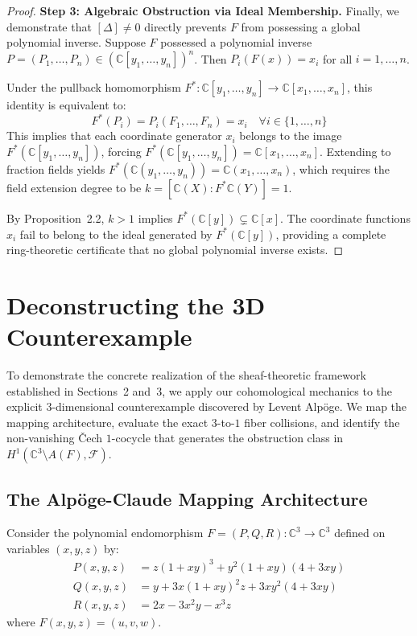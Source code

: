 \documentclass[11pt,reqno]{amsart}
\theoremstyle{definition}
\begin{document}
\begin{proof}
\textbf{Step 3: Algebraic Obstruction via Ideal Membership.}
Finally, we demonstrate that $[\Delta] \neq 0$ directly prevents $F$ from possessing a global polynomial inverse. Suppose $F$ possessed a polynomial inverse $P = (P_1, \dots, P_n) \in (\mathbb{C}[y_1, \dots, y_n])^n$. Then $P_i(F(x)) = x_i$ for all $i = 1, \dots, n$.

Under the pullback homomorphism $F^*: \mathbb{C}[y_1, \dots, y_n] \to \mathbb{C}[x_1, \dots, x_n]$, this identity is equivalent to:
$$F^*(P_i) = P_i(F_1, \dots, F_n) = x_i \quad \forall i \in \{1, \dots, n\}$$
This implies that each coordinate generator $x_i$ belongs to the image $F^*(\mathbb{C}[y_1, \dots, y_n])$, forcing $F^*(\mathbb{C}[y_1, \dots, y_n]) = \mathbb{C}[x_1, \dots, x_n]$. Extending to fraction fields yields $F^*(\mathbb{C}(y_1, \dots, y_n)) = \mathbb{C}(x_1, \dots, x_n)$, which requires the field extension degree to be $k = [\mathbb{C}(X) : F^*\mathbb{C}(Y)] = 1$.

By Proposition~2.2, $k > 1$ implies $F^*(\mathbb{C}[y]) \subsetneq \mathbb{C}[x]$. The coordinate functions $x_i$ fail to belong to the ideal generated by $F^*(\mathbb{C}[y])$, providing a complete ring-theoretic certificate that no global polynomial inverse exists.
\end{proof}

\section{Deconstructing the 3D Counterexample}

To demonstrate the concrete realization of the sheaf-theoretic framework established in Sections~2 and~3, we apply our cohomological mechanics to the explicit $3$-dimensional counterexample discovered by Levent Alp\"oge. We map the mapping architecture, evaluate the exact $3$-to-$1$ fiber collisions, and identify the non-vanishing \v{C}ech $1$-cocycle that generates the obstruction class in $H^1(\mathbb{C}^3 \setminus A(F), \mathcal{F})$.

\subsection{The Alp\"oge-Claude Mapping Architecture}
Consider the polynomial endomorphism $F = (P, Q, R): \mathbb{C}^3 \to \mathbb{C}^3$ defined on variables $(x, y, z)$ by:
\begin{align*}
P(x,y,z) &= z(1+xy)^3 + y^2(1+xy)(4+3xy) \\
Q(x,y,z) &= y + 3x(1+xy)^2z + 3xy^2(4+3xy) \\
R(x,y,z) &= 2x - 3x^2y - x^3z
\end{align*}
where $F(x,y,z) = (u,v,w)$.
\end{document}
